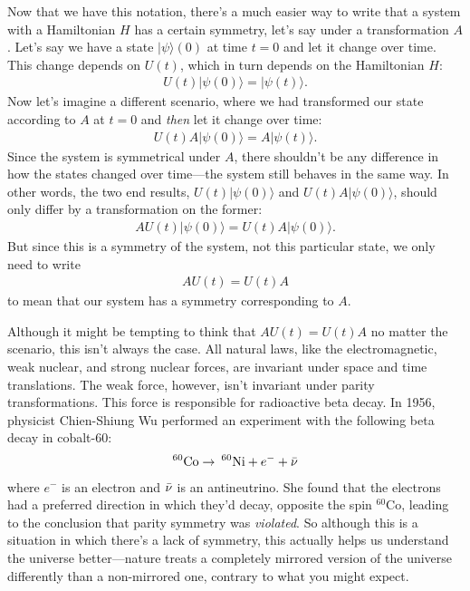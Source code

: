 Now that we have this notation, there's a much easier way to write that a system with a Hamiltonian $H$ has a certain symmetry, let's say under a transformation $A$. Let's say we have a state $|\psi\rangle(0)$ at time $t=0$ and let it change over time. This change depends on $U(t)$, which in turn depends on the Hamiltonian $H$:
\begin{align*}
    U(t)|\psi(0)\rangle = |\psi(t)\rangle.
\end{align*}
Now let's imagine a different scenario, where we had transformed our state according to $A$ at $t=0$ and \emph{then} let it change over time:
\begin{align*}
    U(t)A|\psi(0)\rangle = A|\psi(t)\rangle.
\end{align*}
Since the system is symmetrical under $A$, there shouldn't be any difference in how the states changed over time---the system still behaves in the same way. In other words, the two end results, $U(t)|\psi(0)\rangle$ and $U(t)A|\psi(0)\rangle$, should only differ by a transformation on the former:
\begin{align*}
    AU(t)|\psi(0)\rangle = U(t)A|\psi(0)\rangle.
\end{align*}
But since this is a symmetry of the system, not this particular state, we only need to write
\begin{align*}
    AU(t) = U(t)A
\end{align*}
to mean that our system has a symmetry corresponding to $A$.

Although it might be tempting to think that $AU(t) = U(t)A$ no matter the scenario, this isn't always the case. All natural laws, like the electromagnetic, weak nuclear, and strong nuclear forces, are invariant under space and time translations. The weak force, however, isn't invariant under parity transformations. This force is responsible for radioactive beta decay. In 1956, physicist Chien-Shiung Wu performed an experiment with the following beta decay in cobalt-60:
\begin{align*}
    ^{60}\text{Co} \rightarrow\: ^{60}\text{Ni} + e^- + \Bar{\nu}
\end{align*}
where $e^-$ is an electron and $\Bar{\nu}$ is an antineutrino. She found that the electrons had a preferred direction in which they'd decay, opposite the spin $^{60}\text{Co}$, leading to the conclusion that parity symmetry was \emph{violated}. So although this is a situation in which there's a lack of symmetry, this actually helps us understand the universe better---nature treats a completely mirrored version of the universe differently than a non-mirrored one, contrary to what you might expect.

